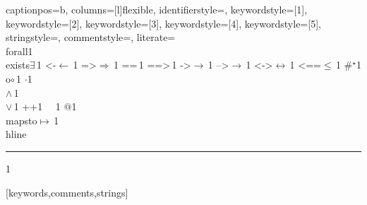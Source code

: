 {%
captionpos=b,
%
columns=[l]flexible,
%
identifierstyle={\ttfamily\color{black}},
keywordstyle=[1]{\ttfamily\color{dkviolet}},
keywordstyle=[2]{\ttfamily\color{dkgreen}},
keywordstyle=[3]{\ttfamily\color{ltblue}},
keywordstyle=[4]{\ttfamily\color{dkblue}},
keywordstyle=[5]{\ttfamily\color{dkred}},
stringstyle=\ttfamily,
commentstyle={\ttfamily\color{dkgreen}},
%
literate=
    {\\forall}{{\color{dkgreen}{$\forall\,$}}}1
    {\\exists}{{$\exists\,$}}1
    {<-}{{$\leftarrow\,$}}1
    {=>}{{$\Rightarrow\,$}}1
    {==}{{\code{==}\,}}1
    {==>}{{\code{==>}\,}}1
    {->}{{$\rightarrow\,$}}1
    {-->}{{$\longrightarrow\,$}}1
    {<->}{{$\leftrightarrow\,$}}1
    {<==}{{$\leq\,$}}1
    {\#}{{$^\star$}}1
    {\\o}{{$\circ\,$}}1
    {\@}{{$\cdot$}}1
    {\/\\}{{$\wedge\,$}}1
    {\\\/}{{$\vee\,$}}1
    {++}{{\code{++}}}1
    {~}{{\ }}1
    {\@\@}{{$@$}}1
    {\\mapsto}{{$\mapsto\,$}}1
    {\\hline}{{\rule{\linewidth}{0.5pt}}}1
%
}[keywords,comments,strings]


\def\coqe{\lstinline[language=Coq, basicstyle=\small]}
% pour inliner dans les tableaux / displaymath...
\def\coqes{\lstinline[language=Coq, basicstyle=\scriptsize]}

